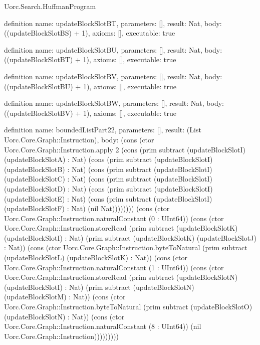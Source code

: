 \begin{lexlean}{Uorc.Search.HuffmanProgram}
\begin{semanticmodule}
definition{
  name: updateBlockSlotBT,
  parameters: [],
  result: Nat,
  body: ((updateBlockSlotBS) + 1),
  axioms: [],
  executable: true
}

definition{
  name: updateBlockSlotBU,
  parameters: [],
  result: Nat,
  body: ((updateBlockSlotBT) + 1),
  axioms: [],
  executable: true
}

definition{
  name: updateBlockSlotBV,
  parameters: [],
  result: Nat,
  body: ((updateBlockSlotBU) + 1),
  axioms: [],
  executable: true
}

definition{
  name: updateBlockSlotBW,
  parameters: [],
  result: Nat,
  body: ((updateBlockSlotBV) + 1),
  axioms: [],
  executable: true
}

definition{
  name: boundedListPart22,
  parameters: [],
  result: (List Uorc.Core.Graph::Instruction),
  body: (cons (ctor Uorc.Core.Graph::Instruction.apply 2 (cons (prim subtract (updateBlockSlotI) (updateBlockSlotA) : Nat) (cons (prim subtract (updateBlockSlotI) (updateBlockSlotB) : Nat) (cons (prim subtract (updateBlockSlotI) (updateBlockSlotC) : Nat) (cons (prim subtract (updateBlockSlotI) (updateBlockSlotD) : Nat) (cons (prim subtract (updateBlockSlotI) (updateBlockSlotE) : Nat) (cons (prim subtract (updateBlockSlotI) (updateBlockSlotF) : Nat) (nil Nat)))))))) (cons (ctor Uorc.Core.Graph::Instruction.naturalConstant (0 : UInt64)) (cons (ctor Uorc.Core.Graph::Instruction.storeRead (prim subtract (updateBlockSlotK) (updateBlockSlotI) : Nat) (prim subtract (updateBlockSlotK) (updateBlockSlotJ) : Nat)) (cons (ctor Uorc.Core.Graph::Instruction.byteToNatural (prim subtract (updateBlockSlotL) (updateBlockSlotK) : Nat)) (cons (ctor Uorc.Core.Graph::Instruction.naturalConstant (1 : UInt64)) (cons (ctor Uorc.Core.Graph::Instruction.storeRead (prim subtract (updateBlockSlotN) (updateBlockSlotI) : Nat) (prim subtract (updateBlockSlotN) (updateBlockSlotM) : Nat)) (cons (ctor Uorc.Core.Graph::Instruction.byteToNatural (prim subtract (updateBlockSlotO) (updateBlockSlotN) : Nat)) (cons (ctor Uorc.Core.Graph::Instruction.naturalConstant (8 : UInt64)) (nil Uorc.Core.Graph::Instruction)))))))))
}


\end{semanticmodule}
\end{lexlean}
